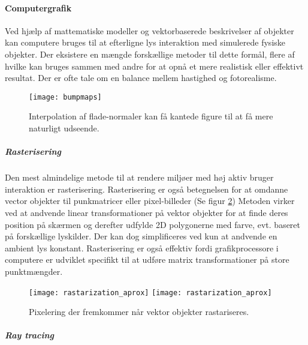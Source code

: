 \paragraph{Computergrafik}
Ved hjælp af mattematiske modeller og vektorbaserede beskrivelser af objekter kan computere bruges til at efterligne lys interaktion med simulerede fysiske objekter. Der eksistere en mængde forskællige metoder til dette formål, flere af hvilke kan bruges sammen med andre for at opnå et mere realistisk eller effektivt resultat. Der er ofte tale om en balance mellem hastighed og fotorealisme.
\begin{figure}[H]
    \texttt{[image: bumpmaps]}
    \caption{Interpolation af flade-normaler kan få kantede figure til at få mere naturligt udseende.}
    \label{fig:tid_versus_kvalitet}
\end{figure}
\subparagraph{Rasterisering}
Den mest almindelige metode til at rendere miljøer med høj aktiv bruger interaktion er rasterisering. Rasterisering er også betegnelsen for at omdanne vector objekter til punkmatricer eller pixel-billeder (Se figur \ref{fig:pixelering}) Metoden virker ved at andvende linear transformationer på vektor objekter for at finde deres position på skærmen og derefter udfylde 2D polygonerne med farve, evt. baseret på forskællige lyskilder. Der kan dog simplificeres ved kun at andvende en ambient lys konstant. Rasterisering er også effektiv fordi grafikprocessore i computere er udviklet specifikt til at udføre matrix transformationer på store punktmængder.
\begin{figure}[H]
    \centering
    \texttt{[image: rastarization\_aprox]}
    \texttt{[image: rastarization\_aprox]}
    \caption{Pixelering der fremkommer når vektor objekter rastariseres.}
    \label{fig:pixelering}
\end{figure}
\subparagraph{Ray tracing}
% 
